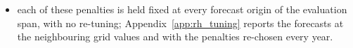 \begin{itemize}
\begin{itemize}
  \item each of these penalties is held fixed at every forecast origin of the evaluation span, with no re-tuning;
    Appendix~\ref{app:rh_tuning} reports the forecasts at the neighbouring grid values and with the penalties
    re-chosen every year.

\end{itemize}
\end{itemize}
